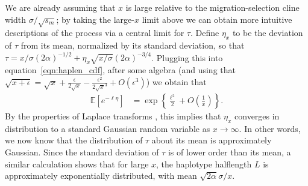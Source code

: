 \documentclass{article}
\newcommand{\E}{\mathbb{E}}
\begin{document}
We are already assuming that $x$ is large relative to the migration-selection cline width $\sigma/\sqrt{s_m}$;
by taking the large-$x$ limit above we can obtain more intuitive descriptions of the process
via a central limit for $\tau$.
Define $\eta_x$ to be the deviation of $\tau$ from its mean, normalized by its standard deviation,
so that $\tau = x/\sigma(2\alpha)^{-1/2} + \eta_x \sqrt{x/\sigma} (2\alpha)^{-3/4}$.
Plugging this into equation~\eqref{eqn:haplen_cdf},
after some algebra (and using that $\sqrt{x+\epsilon} = \sqrt{x} + \frac{\epsilon}{2\sqrt{x}} - \frac{\epsilon^2}{2\sqrt{x}^3} + O(\epsilon^3)$) we obtain that
\begin{align}
  \E[e^{-\ell \eta}] &= \exp\left\{ \frac{\ell^2}{2} + O\left(\frac{1}{x}\right) \right\}.
\end{align}
By the properties of Laplace transforms \citep{durrett},
this implies that $\eta_x$ converges in distribution to a standard Gaussian random variable as $x \to \infty$.
In other words, we now know that the distribution of $\tau$ about its mean is approximately Gaussian.
Since the standard deviation of $\tau$ is of lower order than its mean,
a similar calculation shows that for large $x$, the haplotype halflength $L$ is approximately exponentially distributed, 
with mean $\sqrt{2\alpha} \sigma/x$.



\end{document}
